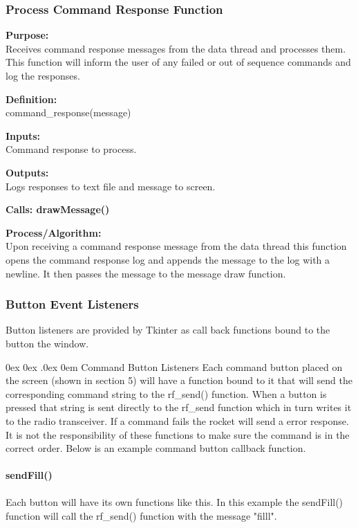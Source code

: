 \documentclass[10pt,draftclsnofoot,onecolumn,compsoc]{IEEEtran}
\makeatletter
\renewcommand\paragraph{\@startsection{paragraph}{4}{\z@}%
                                    {0ex \@plus0ex \@minus.0ex}%
                                    {0em}%
                                    {\normalfont\normalsize\bfseries}}
\makeatother
\begin{document}
\subsubsection{Process Command Response Function}
{\bf Purpose:} \\
Receives command response messages from the data thread and processes them. This function will inform the user of any failed or out of sequence commands and log the responses.  \par
{\bf Definition:} \\ 
command\_response(message) \par
{\bf Inputs:} \\  Command response to process. \par
{\bf Outputs:} \\ Logs responses to text file and message to screen. \par
{\bf Calls: drawMessage()}\par
{\bf Process/Algorithm:} \\
Upon receiving a command response message from the data thread this function opens the command response log and appends the message to the log with a newline. It then passes the message to the message draw function. \par

\subsubsection{Button Event Listeners}
Button listeners are provided by Tkinter as call back functions bound to the button the window. 

\paragraph{Command Button Listeners}
Each command button placed on the screen (shown in section 5) will have a function bound to it that will send the corresponding command string to the rf\_send() function. When a button is pressed that string is sent directly to the rf\_send function which in turn writes it to the radio transceiver. If a command fails the rocket will send a error response. It is not the responsibility of these functions to make sure the command is in the correct order. Below is an example command button callback function. \\ \\
{\bf sendFill() }
\\  \\
Each button will have its own functions like this. In this example the sendFill() function will call the rf\_send() function with the message "filll".
\end{document}
